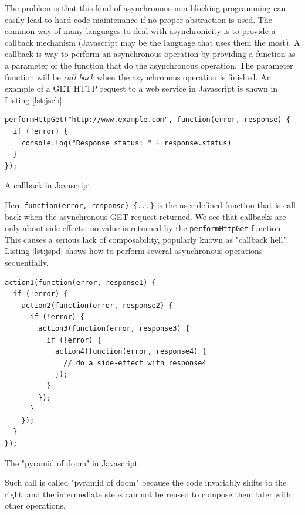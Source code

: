 The problem is that this kind of asynchronous non-blocking programming can easily lead to hard code maintenance if no proper abstraction is used. The common way
of many languages to deal with asynchronicity is to provide a callback mechanism (Javascript may be the language that uses them the most). A callback is
way to perform an asynchronous operation by providing a function as a parameter of the function that do the asynchronous operation. The parameter function
will be \textit{call back} when the asynchronous operation is finished. An example of a GET HTTP request to a web service in Javascript is shown in Listing 
\ref{lst:jscb}.

\begin{listing}[h]
\begin{verbatim}
performHttpGet("http://www.example.com", function(error, response) {
  if (!error) {
    console.log("Response status: " + response.status)
  }
});
\end{verbatim}
\caption{A callback in Javascript}
\label{lst:jscb}
\end{listing}

Here \verb|function(error, response) {...}| is the user-defined function that is call back when the asynchronous GET request
returned. We see that callbacks are only about side-effects: no value is returned by the \verb|performHttpGet| function.
This causes a serious lack of composability, popularly known as "callback hell". Listing \ref{lst:jspd} shows how to perform several asynchronous operations
sequentially.

\begin{listing}[h]
\begin{verbatim}
action1(function(error, response1) {
  if (!error) {
    action2(function(error, response2) {
      if (!error) {
        action3(function(error, response3) {
          if (!error) {
            action4(function(error, response4) {
              // do a side-effect with response4       
            });
          }
        });
      }
    });
  }
});
\end{verbatim}
\caption{The "pyramid of doom" in Javascript}
\label{lst:jspd}
\end{listing}

Such call is called "pyramid of doom" because the code invariably shifts to the right, and the intermediate steps can not be reused to compose
them later with other operations. 

